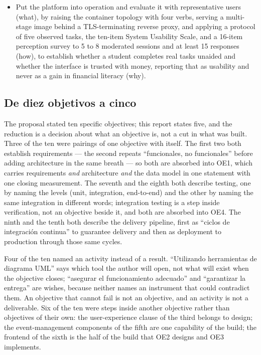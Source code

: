 \begin{itemize}
  \item[OE5.] \label{oe5} Put the platform into operation and evaluate it with
  representative users (what), by raising the container topology with four verbs,
  serving a multi-stage image behind a TLS-terminating reverse proxy, and applying a
  protocol of five observed tasks, the ten-item System Usability Scale, and a
  16-item perception survey to 5 to 8 moderated sessions and at least 15 responses
  (how), to establish whether a student completes real tasks unaided and whether the
  interface is trusted with money, reporting that as usability and never as a gain
  in financial literacy (why).
\end{itemize}

\subsection{De diez objetivos a cinco}

The proposal stated ten specific objectives; this report states five, and the
reduction is a decision about what an objective is, not a cut in what was built.
Three of the ten were pairings of one objective with itself. The first two both
establish requirements — the second repeats \enquote{funcionales, no funcionales}
before adding architecture in the same breath — so both are absorbed into OE1,
which carries requirements \emph{and} architecture \emph{and} the data model in one
statement with one closing measurement. The seventh and the eighth both describe
testing, one by naming the levels (unit, integration, end-to-end) and the other by
naming the same integration in different words; integration testing is a step
inside verification, not an objective beside it, and both are absorbed into OE4.
The ninth and the tenth both describe the delivery pipeline, first as
\enquote{ciclos de integración continua} to guarantee delivery and then as
deployment to production through those same cycles.

Four of the ten named an activity instead of a result. \enquote{Utilizando
herramientas de diagrama UML} says which tool the author will open, not what will
exist when the objective closes; \enquote{asegurar el funcionamiento adecuado} and
\enquote{garantizar la entrega} are wishes, because neither names an instrument
that could contradict them. An objective that cannot fail is not an objective, and
an activity is not a deliverable. Six of the ten were steps inside another
objective rather than objectives of their own: the user-experience clause of the
third belongs to design; the event-management components of the fifth are one
capability of the build; the frontend of the sixth is the half of the build that
OE2 designs and OE3 implements.

